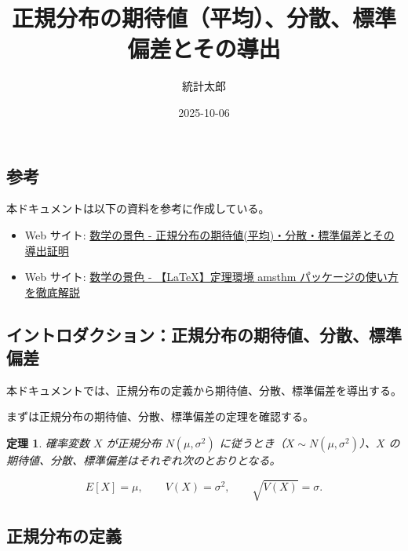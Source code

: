\documentclass[
  11pt,
  a4paper,
]{extarticle}
\title{正規分布の期待値（平均）、分散、標準偏差とその導出}
\author{統計太郎}
\date{2025-10-06}
\providecommand{\tightlist}{%
  \setlength{\itemsep}{0pt}\setlength{\parskip}{0pt}}
\numberwithin{equation}{section}
\theoremstyle{plain}
\newtheorem*{thm*}{定理}
\theoremstyle{definition}
\begin{document}
\maketitle

\maketitle

\tableofcontents

\subsection{参考}\label{ux53c2ux8003}

本ドキュメントは以下の資料を参考に作成している。

\begin{itemize}
\tightlist
\item
  Web サイト:
  \href{https://mathlandscape.com/normal-distrib-ev/}{数学の景色 -
  正規分布の期待値(平均)・分散・標準偏差とその導出証明}
\item
  Web サイト: \href{https://mathlandscape.com/latex-amsthm/}{数学の景色
  - 【LaTeX】定理環境 amsthm パッケージの使い方を徹底解説}
\end{itemize}

\newpage

\subsection{イントロダクション：正規分布の期待値、分散、標準偏差}\label{ux30a4ux30f3ux30c8ux30edux30c0ux30afux30b7ux30e7ux30f3ux6b63ux898fux5206ux5e03ux306eux671fux5f85ux5024ux5206ux6563ux6a19ux6e96ux504fux5dee}

本ドキュメントでは、正規分布の定義から期待値、分散、標準偏差を導出する。

まずは正規分布の期待値、分散、標準偏差の定理を確認する。

\begin{thm*}

確率変数 $X$ が正規分布 $N(\mu, \sigma^2)$ に従うとき（$X \sim N(\mu, \sigma^2)$）、$X$ の期待値、分散、標準偏差はそれぞれ次のとおりとなる。

$$
E[X] = \mu, \qquad V(X) = \sigma^2, \qquad \sqrt{V(X)} = \sigma.
$$

\end{thm*}

\subsection{正規分布の定義}\label{ux6b63ux898fux5206ux5e03ux306eux5b9aux7fa9}
\end{document}
